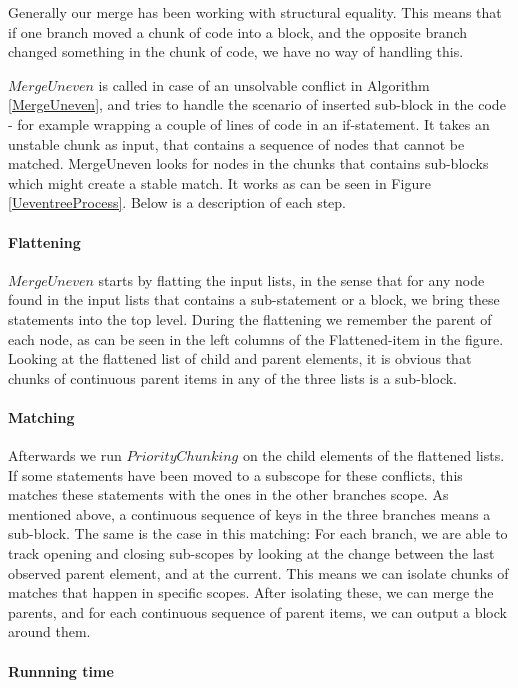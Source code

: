 \documentclass[11pt]{article}
\begin{document}
\label{MergingUnevenSection}
Generally our merge has been working with structural equality. This means that if one branch moved a chunk of code into a block, and the opposite branch changed something in the chunk of code, we have no way of handling this.

$MergeUneven$ is called in case of an unsolvable conflict in Algorithm \ref{MergeUneven}, and tries to handle the scenario of inserted sub-block in the code - for example wrapping a couple of lines of code in an if-statement. It takes an unstable chunk as input, that contains a sequence of nodes that cannot be matched. MergeUneven looks for nodes in the chunks that contains sub-blocks which might create a stable match. It works as can be seen in Figure \ref{UeventreeProcess}. Below is a description of each step.

\paragraph{Flattening} $MergeUneven$ starts by flatting the input lists, in the sense that for any node found in the input lists that contains a sub-statement or a block, we bring these statements into the top level. During the flattening we remember the parent of each node, as can be seen in the left columns of the Flattened-item in the figure. Looking at the flattened list of child and parent elements,  it is obvious that chunks of continuous parent items in any of the three lists is a sub-block.

\paragraph{Matching} Afterwards we run $PriorityChunking$ on the child elements of the flattened lists. If some statements have been moved to a subscope for these conflicts, this matches these statements with the ones in the other branches scope. As mentioned above, a continuous sequence of keys in the three branches means a sub-block. The same is the case in this matching: For each branch, we are able to track opening and closing sub-scopes by looking at the change between the last observed parent element, and at the current. This means we can isolate chunks of matches that happen in specific scopes. After isolating these, we can merge the parents, and for each continuous sequence of parent items, we can output a block around them.

\paragraph{Runnning time} 
\end{document}
